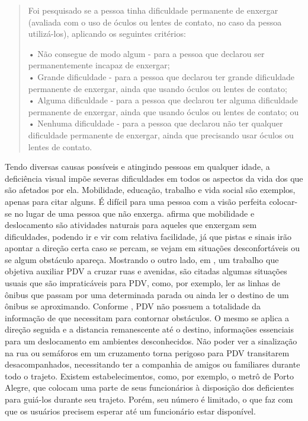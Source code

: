 \documentclass[english,brazilian]{UNISINOSmonografia}
\begin{document}
\begin{quote}
	Foi pesquisado se a pessoa tinha dificuldade permanente de enxergar (avaliada com o uso de óculos ou lentes de contato, no caso da pessoa utilizá-los), aplicando os seguintes critérios:
		
	• Não consegue de modo algum - para a pessoa que declarou ser permanentemente incapaz de enxergar; \\
	• Grande dificuldade - para a pessoa que declarou ter grande dificuldade permanente de enxergar, ainda que usando óculos ou lentes de contato; \\
	• Alguma dificuldade - para a pessoa que declarou ter alguma dificuldade permanente de enxergar, ainda que usando óculos ou lentes de contato; ou \\
	• Nenhuma dificuldade - para a pessoa que declarou não ter qualquer dificuldade permanente de enxergar, ainda que precisando usar óculos ou lentes de contato.
\end{quote}

Tendo diversas causas possíveis e atingindo pessoas em qualquer idade, a deficiência visual impõe severas dificuldades em todos os aspectos da vida dos que são afetados por ela. Mobilidade, educação, trabalho e vida social são exemplos, apenas para citar alguns. É difícil para uma pessoa com a visão perfeita colocar-se no lugar de uma pessoa que não enxerga.  afirma que mobilidade e deslocamento são atividades naturais para aqueles que enxergam sem dificuldades, podendo ir e vir com relativa facilidade, já que pistas e sinais irão apontar a direção certa caso se percam, se vejam em situações desconfortáveis ou se algum obstáculo apareça. Mostrando o outro lado, em , um trabalho que objetiva auxiliar PDV a cruzar ruas e avenidas, são citadas algumas situações usuais que são impraticáveis para PDV, como, por exemplo, ler as linhas de ônibus que passam por uma determinada parada ou ainda ler o destino de um ônibus se aproximando. Conforme , PDV não possuem a totalidade da informação de que necessitam para contornar obstáculos. O mesmo se aplica a direção seguida e a distancia remanescente até o destino, informações essenciais para um deslocamento em ambientes desconhecidos. Não poder ver a sinalização na rua ou semáforos em um cruzamento torna perigoso para PDV transitarem desacompanhados, necessitando ter a companhia de amigos ou familiares durante todo o trajeto. Existem estabelecimentos, como, por exemplo, o metrô de Porto Alegre, que colocam uma parte de seus funcionários à disposição dos deficientes para guiá-los durante seu trajeto. Porém, seu número é limitado, o que faz com que os usuários precisem esperar até um funcionário estar disponível.
\end{document}
